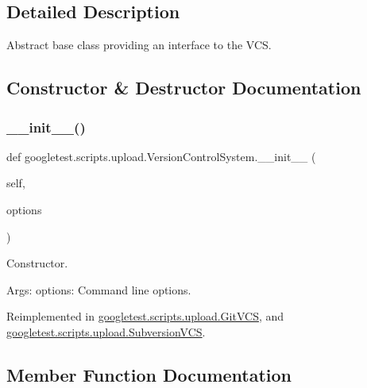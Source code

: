 \subsection{Detailed Description}
\begin{DoxyVerb}Abstract base class providing an interface to the VCS.\end{DoxyVerb}
 

\subsection{Constructor \& Destructor Documentation}
\mbox{\label{classgoogletest_1_1scripts_1_1upload_1_1_version_control_system_a9dacd7672221771e0daf316d8c53e11c}} 
\subsubsection{\texorpdfstring{\_\_init\_\_()}{\_\_init\_\_()}}
{\footnotesize\ttfamily def googletest.\+scripts.\+upload.\+Version\+Control\+System.\+\_\+\+\_\+init\+\_\+\+\_\+ (\begin{DoxyParamCaption}\item[{}]{self,  }\item[{}]{options }\end{DoxyParamCaption})}

\begin{DoxyVerb}Constructor.

Args:
  options: Command line options.
\end{DoxyVerb}
 

Reimplemented in \mbox{\hyperlink{classgoogletest_1_1scripts_1_1upload_1_1_git_v_c_s_a855833d850b297b23bee62796275adb7}{googletest.\+scripts.\+upload.\+Git\+V\+CS}}, and \mbox{\hyperlink{classgoogletest_1_1scripts_1_1upload_1_1_subversion_v_c_s_a1ddd99fb8914f899805a816c8daae63c}{googletest.\+scripts.\+upload.\+Subversion\+V\+CS}}.



\subsection{Member Function Documentation}
\mbox{\label{classgoogletest_1_1scripts_1_1upload_1_1_version_control_system_a00a0425490711b49a9bea0c38ba74003}} 
